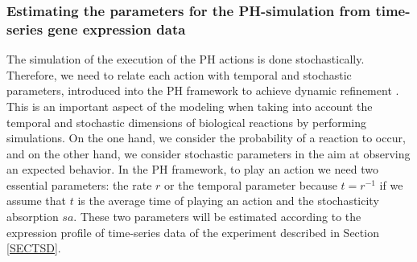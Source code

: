 





\subsubsection{Estimating the parameters for the PH-simulation from time-series gene expression data}


The simulation of the execution of the PH actions is done stochastically.  Therefore, we need to relate each action with temporal 
and stochastic parameters, introduced into the PH framework to achieve dynamic refinement \cite{PMR10-TCSB}. 
This is an important aspect of the modeling when taking into account the temporal and stochastic dimensions of 
biological reactions by performing simulations. 
On the one hand, we consider the probability of a reaction to occur, and on the other hand, we 
consider stochastic parameters in the aim at observing an expected behavior. 
In the PH framework, to play an action we need two essential parameters: the rate $r$ or the temporal parameter because $t=r^{-1}$ if we assume that $t$ is the average time of playing an action
and the stochasticity absorption $sa$. These two parameters will be estimated according to the expression profile of time-series data of the experiment
described in Section \ref{SECTSD}. 






